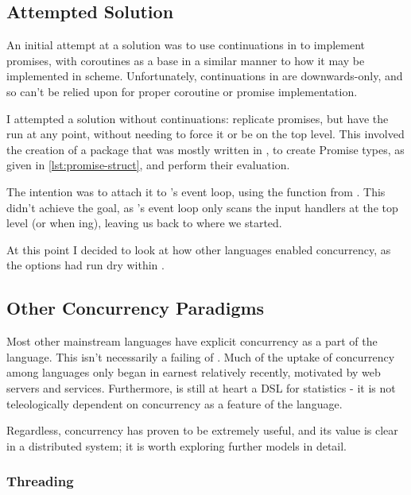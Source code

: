 \subsection{Attempted Solution}

An initial attempt at a solution was to use continuations in \R{} to implement promises, with coroutines as a base in a similar manner to how it may be implemented in scheme.
Unfortunately, continuations in \R{} are downwards-only, and so can't be relied upon for proper coroutine or promise implementation.

I attempted a solution without continuations: replicate promises, but have the  run at any point, without needing to force it or be on the top level.
This involved the creation of a package that was mostly written in , to create Promise types, as given in \cref{lst:promise-struct}, and perform their evaluation.


The intention was to attach it to \R{}'s event loop, using the  function from .
This didn't achieve the goal, as \R{}'s event loop only scans the input handlers at the top level (or when ing), leaving us back to where we started.

At this point I decided to look at how other languages enabled concurrency, as the options had run dry within \R{}.

\subsection{Other Concurrency Paradigms}

Most other mainstream languages have explicit concurrency as a part of the language.
This isn't necessarily a failing of \R{}.
Much of the uptake of concurrency among languages only began in earnest relatively recently, motivated by web servers and services.
Furthermore, \R{} is still at heart a DSL for statistics - it is not teleologically dependent on concurrency as a feature of the language.

Regardless, concurrency has proven to be extremely useful, and its value is clear in a distributed system;
it is worth exploring further models in detail.

\subsubsection{Threading}


